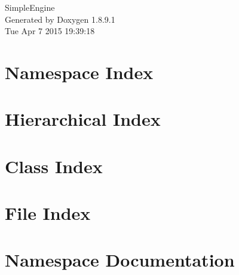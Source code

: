 \documentclass[twoside]{book}
\newcommand{\+}{\discretionary{\mbox{\scriptsize$\hookleftarrow$}}{}{}}
\newcommand{\clearemptydoublepage}{%
  \newpage{\pagestyle{empty}\cleardoublepage}%
}
\begin{document}
\begin{titlepage}
\vspace*{7cm}
\begin{center}%
{\Large Simple\+Engine }\\
\vspace*{1cm}
{\large Generated by Doxygen 1.8.9.1}\\
\vspace*{0.5cm}
{\small Tue Apr 7 2015 19:39:18}\\
\end{center}
\end{titlepage}
\clearemptydoublepage
\tableofcontents
\clearemptydoublepage
{}

\chapter{Namespace Index}

\chapter{Hierarchical Index}

\chapter{Class Index}

\chapter{File Index}

\chapter{Namespace Documentation}

\end{document}
